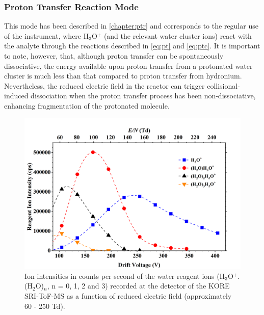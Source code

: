 \subsubsection{Proton Transfer Reaction Mode}
This mode has been described in \autoref{chapter:ptr} and corresponds to the regular use of the instrument, where H$_3$O$^+$ (and the relevant water cluster ions) react with the analyte through the reactions described in \autoref{eq:pt} and \autoref{eq:ptc}. 
It is important to note, however, that, although proton transfer can be spontaneously dissociative, the energy available upon proton transfer from a protonated water cluster is much less than that compared to proton transfer from hydronium.
Nevertheless, the reduced electric field in the reactor can trigger collisional-induced dissociation when the proton transfer process has been non-dissociative, enhancing fragmentation of the protonated molecule.


\begin{figure}%
\centering
\includegraphics[height=0.35\textheight]{pics/nitros_paper_1.png}
\caption{Ion intensities in counts per second of the water reagent ions (H$_3$O$^+$.(H$_2$O)$_n$, n = 0, 1, 2 and 3) recorded at the detector of the KORE SRI-ToF-MS as a function of reduced electric field (approximately 60 - 250 Td).}
\label{fig:na_fig1}
\end{figure}

